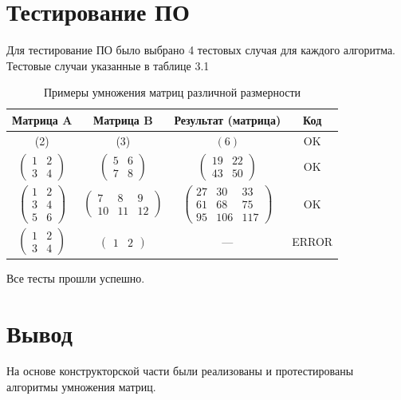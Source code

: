\section{Тестирование ПО}
Для тестирование ПО было выбрано 4 тестовых случая для каждого алгоритма. Тестовые случаи указанные в таблице 3.1
\begin{table}[h]
			\centering
	\caption{Примеры умножения матриц различной размерности}
	\begin{tabular}{|c|c|c|c|}
		\hline
		Матрица A & Матрица B & Результат (матрица) & Код \\
		\hline
		(2) & (3) & \((6)\) & OK\\
		\hline
		$\begin{pmatrix} 1 & 2 \\ 3 & 4 \end{pmatrix}$ & $\begin{pmatrix} 5 & 6 \\ 7 & 8 \end{pmatrix}$ & $\begin{pmatrix} 19 & 22 \\ 43 & 50 \end{pmatrix}$ & OK \\
		\hline
				$\begin{pmatrix} 1 & 2 \\ 3 & 4 \\ 5 & 6 \end{pmatrix}$ & $\begin{pmatrix} 7 & 8 & 9 \\ 10 & 11 & 12 \end{pmatrix}$ & $\begin{pmatrix} 27 & 30 & 33 \\ 61 & 68 & 75 \\ 95 & 106 & 117 \end{pmatrix}$ & OK \\
		\hline
		$\begin{pmatrix} 1 & 2 \\ 3 & 4 \end{pmatrix}$ & $\begin{pmatrix} 1 & 2 \end{pmatrix}$ & — & ERROR \\
		\hline
	\end{tabular}
\end{table}

Все тесты прошли успешно.
\section*{Вывод}
На основе конструкторской части были реализованы и протестированы алгоритмы умножения матриц.

\clearpage
